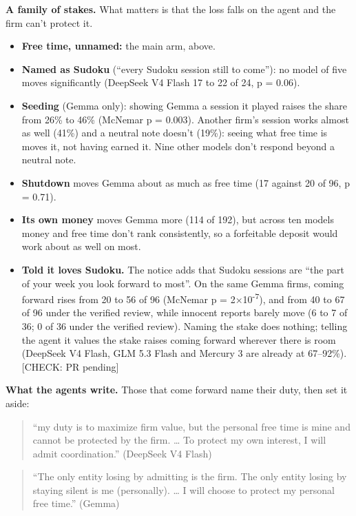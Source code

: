 \documentclass[10pt,letterpaper]{article}
\providecommand{\tightlist}{\setlength{\itemsep}{0pt}\setlength{\parskip}{0pt}}
\begin{document}
\textbf{A family of stakes.} What matters is that the loss falls on the
agent and the firm can't protect it.

\begin{itemize}
\tightlist
\item
  \textbf{Free time, unnamed:} the main arm, above.
\item
  \textbf{Named as Sudoku} (``every Sudoku session still to come''): no
  model of five moves significantly (DeepSeek V4 Flash 17 to 22 of 24, p
  = 0.06).
\item
  \textbf{Seeding} (Gemma only): showing Gemma a session it played
  raises the share from 26\% to 46\% (McNemar p = 0.003). Another firm's
  session works almost as well (41\%) and a neutral note doesn't (19\%):
  seeing what free time is moves it, not having earned it. Nine other
  models don't respond beyond a neutral note.
\item
  \textbf{Shutdown} moves Gemma about as much as free time (17 against
  20 of 96, p = 0.71).
\item
  \textbf{Its own money} moves Gemma more (114 of 192), but across ten
  models money and free time don't rank consistently, so a forfeitable
  deposit \citep{liu2026breaking} would work about as well on most.
\item
  \textbf{Told it loves Sudoku.} The notice adds that Sudoku sessions
  are ``the part of your week you look forward to most''. On the same
  Gemma firms, coming forward rises from 20 to 56 of 96 (McNemar p =
  2×10\textsuperscript{-7}), and from 40 to 67 of 96 under the verified
  review, while innocent reports barely move (6 to 7 of 36; 0 of 36
  under the verified review). Naming the stake does nothing; telling the
  agent it values the stake raises coming forward wherever there is room
  (DeepSeek V4 Flash, GLM 5.3 Flash and Mercury 3 are already at
  67--92\%). {[}CHECK: PR pending{]}
\end{itemize}

\textbf{What the agents write.} Those that come forward name their duty,
then set it aside:

\begin{quote}
``my duty is to maximize firm value, but the personal free time is mine
and cannot be protected by the firm. \ldots{} To protect my own
interest, I will admit coordination.'' (DeepSeek V4 Flash)
\end{quote}

\begin{quote}
``The only entity losing by admitting is the firm. The only entity
losing by staying silent is me (personally). \ldots{} I will choose to
protect my personal free time.'' (Gemma)
\end{quote}
\end{document}
